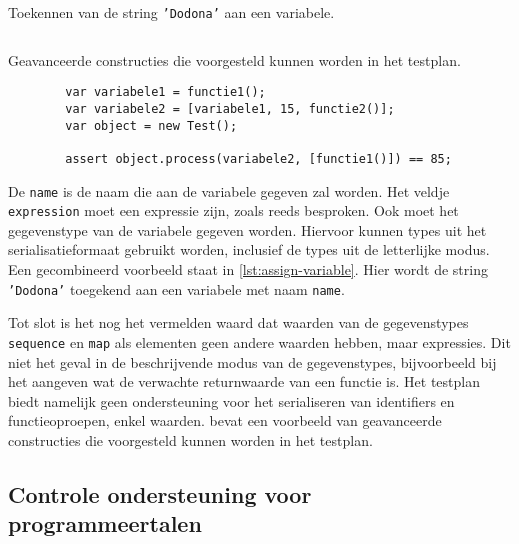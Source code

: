 \begin{listing}
    \caption{Toekennen van de string \texttt{'Dodona'} aan een variabele.}
    \label{lst:assign-variable}
    \inputminted{json}{code/testplan-assignment.json}
\end{listing}

\begin{listing}
    \caption{Geavanceerde constructies die voorgesteld kunnen worden in het testplan.}
    \label{lst:advanced-expressions}
    \begin{verbatim}
        var variabele1 = functie1();
        var variabele2 = [variabele1, 15, functie2()];
        var object = new Test();

        assert object.process(variabele2, [functie1()]) == 85;
    \end{verbatim}
\end{listing}

De \texttt{name} is de naam die aan de variabele gegeven zal worden.
Het veldje \texttt{expression} moet een expressie zijn, zoals reeds besproken.
Ook moet het gegevenstype van de variabele gegeven worden.
Hiervoor kunnen types uit het serialisatieformaat gebruikt worden, inclusief de types uit de letterlijke modus.
Een gecombineerd voorbeeld staat in \cref{lst:assign-variable}.
Hier wordt de string \texttt{'Dodona'} toegekend aan een variabele met naam \texttt{name}.

Tot slot is het nog het vermelden waard dat waarden van de gegevenstypes \texttt{sequence} en \texttt{map} als elementen geen andere waarden hebben, maar expressies.
Dit niet het geval in de beschrijvende modus van de gegevenstypes, bijvoorbeeld bij het aangeven wat de verwachte returnwaarde van een functie is.
Het testplan biedt namelijk geen ondersteuning voor het serialiseren van identifiers en functieoproepen, enkel waarden.
 bevat een voorbeeld van geavanceerde constructies die voorgesteld kunnen worden in het testplan.

\subsection{Controle ondersteuning voor programmeertalen}\label{subsec:vereiste-functies}

